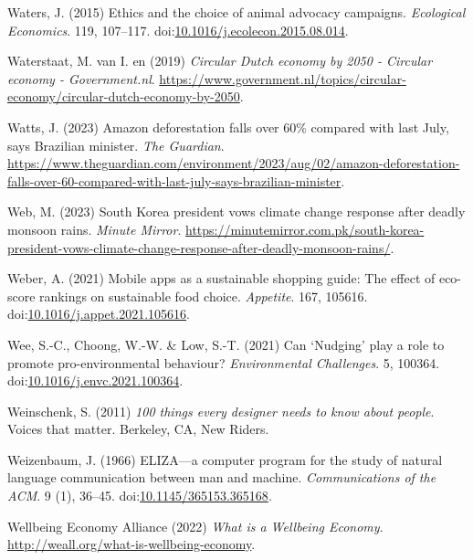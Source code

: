 \documentclass[
  letterpaper,
  DIV=11,
  numbers=noendperiod]{scrartcl}
\newlength{\cslhangindent}
\newenvironment{CSLReferences}[2] %
 {\begin{list}{}{%
  \setlength{\itemindent}{0pt}
  \setlength{\leftmargin}{0pt}
  \setlength{\parsep}{0pt}
  \ifodd #1
   \setlength{\leftmargin}{\cslhangindent}
   \setlength{\itemindent}{-1\cslhangindent}
  \fi
  \setlength{\itemsep}{#2\baselineskip}}}
 {\end{list}}
\begin{document}
\begin{CSLReferences}{0}{1}
Waters, J. (2015) Ethics and the choice of animal advocacy campaigns.
\emph{Ecological Economics}. 119, 107--117.
doi:\href{https://doi.org/10.1016/j.ecolecon.2015.08.014}{10.1016/j.ecolecon.2015.08.014}.

Waterstaat, M. van I. en (2019) \emph{Circular {Dutch} economy by 2050 -
{Circular} economy - {Government}.nl}.
\url{https://www.government.nl/topics/circular-economy/circular-dutch-economy-by-2050}.

Watts, J. (2023) Amazon deforestation falls over 60\% compared with last
{July}, says {Brazilian} minister. \emph{The Guardian}.
\url{https://www.theguardian.com/environment/2023/aug/02/amazon-deforestation-falls-over-60-compared-with-last-july-says-brazilian-minister}.

Web, M. (2023) South {Korea} president vows climate change response
after deadly monsoon rains. \emph{Minute Mirror}.
\url{https://minutemirror.com.pk/south-korea-president-vows-climate-change-response-after-deadly-monsoon-rains/}.

Weber, A. (2021) Mobile apps as a sustainable shopping guide: {The}
effect of eco-score rankings on sustainable food choice.
\emph{Appetite}. 167, 105616.
doi:\href{https://doi.org/10.1016/j.appet.2021.105616}{10.1016/j.appet.2021.105616}.

Wee, S.-C., Choong, W.-W. \& Low, S.-T. (2021) Can {`{Nudging}'} play a
role to promote pro-environmental behaviour? \emph{Environmental
Challenges}. 5, 100364.
doi:\href{https://doi.org/10.1016/j.envc.2021.100364}{10.1016/j.envc.2021.100364}.

Weinschenk, S. (2011) \emph{100 things every designer needs to know
about people}. Voices that matter. Berkeley, CA, New Riders.

Weizenbaum, J. (1966) {ELIZA}---a computer program for the study of
natural language communication between man and machine.
\emph{Communications of the ACM}. 9 (1), 36--45.
doi:\href{https://doi.org/10.1145/365153.365168}{10.1145/365153.365168}.

Wellbeing Economy Alliance (2022) \emph{What is a {Wellbeing Economy}}.
\url{http://weall.org/what-is-wellbeing-economy}.


\end{CSLReferences}
\end{document}
